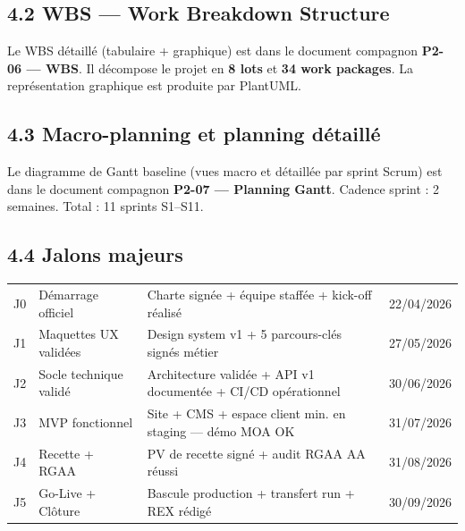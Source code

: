 \documentclass[11pt,a4paper,oneside]{report}
\begin{document}
\subsection*{4.2 WBS --- Work Breakdown Structure}
Le WBS détaillé (tabulaire + graphique) est dans le document compagnon \textbf{P2-06 --- WBS}. Il décompose le projet en \textbf{8 lots} et \textbf{34 work packages}. La représentation graphique est produite par PlantUML.

\subsection*{4.3 Macro-planning et planning détaillé}
Le diagramme de Gantt baseline (vues macro et détaillée par sprint Scrum) est dans le document compagnon \textbf{P2-07 --- Planning Gantt}. Cadence sprint : 2 semaines. Total : 11 sprints S1--S11.

\subsection*{4.4 Jalons majeurs}
\renewcommand{\arraystretch}{1.4}
\begin{tabularx}{\textwidth}{C{1cm} L{5cm} Y C{2cm}}
\toprule
{} &  &  &  \\
\midrule
J0 & Démarrage officiel       & Charte signée + équipe staffée + kick-off réalisé & 22/04/2026 \\
J1 & Maquettes UX validées    & Design system v1 + 5 parcours-clés signés métier & 27/05/2026 \\
J2 & Socle technique validé   & Architecture validée + API v1 documentée + CI/CD opérationnel & 30/06/2026 \\
J3 & MVP fonctionnel          & Site + CMS + espace client min. en staging --- démo MOA OK & 31/07/2026 \\
J4 & Recette + RGAA           & PV de recette signé + audit RGAA AA réussi & 31/08/2026 \\
J5 & Go-Live + Clôture        & Bascule production + transfert run + REX rédigé & 30/09/2026 \\
\bottomrule
\end{tabularx}
\end{document}

